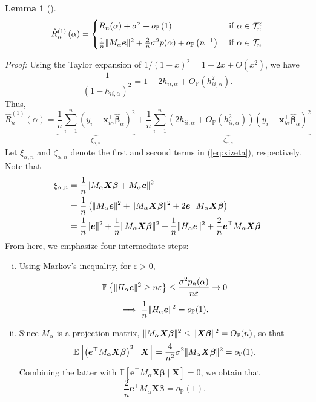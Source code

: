 \documentclass[11pt, letter paper]{article}
\newcommand{\1}{\mathmybb{1}}
\newtheorem{lemma}[proposition]{Lemma}
\newcommand{\0}{\emptyset}
\newcommand{\prob}{\mathbb{P}}
\newcommand{\Ep}[1]{\mathbb{E}\left[ #1 \right]}
\newcommand{\paren}[1]{\left(#1 \right)}
\newcommand{\set}[1]{\left\{ #1 \right\}}
\newcommand{\norm}[1]{|\hspace{-1pt}|#1 |\hspace{-1pt}|}
\newcommand{\normsq}[1]{\norm{#1}^{2}}
\newcommand{\Tcal}{\mathcal{T}_{n}}
\newcommand{\X}{\boldsymbol{X}}
\newcommand{\x}{\boldsymbol{x}}
\newcommand{\e}{\boldsymbol{e}}
\newcommand{\bbeta}{\boldsymbol{\beta}}
\newcommand{\bbetahat}{\boldsymbol{\hat{\beta}}}
\newcommand{\lev}{h_{ii,\alpha}}
\newcommand{\loocv}[1]{\hat{R}^{(1)}_{n}\paren{#1}}
\newcommand{\op}[1]{o_{\prob}\paren{#1}}
\newcommand{\Op}[1]{O_{\prob}\paren{#1}}
\begin{document}
\begin{lemma}[\cite{shao_1993}]\label{lem:lemmadecomp}
    \begin{equation}\label{eq:lemmadecomp}
    \loocv{\alpha} = \begin{cases}
        R_{n}(\alpha) + \sigma^{2} + \op{1} &\text{ if }\alpha\in\Tcal^{c}\\[2mm]
        \frac{1}{n}\normsq{M_{\alpha}\e} + \frac{2}{n}\sigma^{2}p(\alpha) + \op{n^{-1}} &\text{ if }\alpha\in\Tcal
    \end{cases}
    \end{equation}
\end{lemma}

\begin{myproofbox}
    \textit{Proof: }
    Using the Taylor expansion of \(1/{(1-x)}^{2} = 1+2x + O(x^{2})\), we have
    \[\frac{1}{\paren{1-\lev}^{2}} = 1 + 2\lev + \Op{\lev^{2}}.\]
    Thus,
    \begin{equation}
        \label{eq:xizeta}
        \loocv{\alpha} = \underbrace{\frac{1}{n}\sum_{i=1}^{n}\paren{y_{i}-\x_{i\alpha}^{\top}\bbetahat_{\alpha}}^{2}}_{\xi_{\alpha,n}} + \underbrace{\frac{1}{n}\sum_{i=1}^{n}\paren{2\lev + \Op{\lev^{2}}}\paren{y_{i}-\x_{i\alpha}^{\top}\bbetahat_{\alpha}}^{2}}_{\zeta_{\alpha,n}}
    \end{equation}
    Let \(\xi_{\alpha,n}\) and \(\zeta_{\alpha,n}\) denote the first and second terms in (\ref{eq:xizeta}), respectively. Note that
    \begin{align}
        \notag\xi_{\alpha,n} &= \frac{1}{n}\normsq{M_{\alpha}\X\bbeta + M_{\alpha}\e}\\
        \label{line:decomp}&= \frac{1}{n}\paren{\normsq{M_{\alpha}\e} + \normsq{M_{\alpha}\X\bbeta} + 2 \e^{\top}M_{\alpha}\X\bbeta}\\
        \label{line:decomp2}&=\frac{1}{n}\normsq{\e} + \frac{1}{n}\normsq{M_{\alpha}\X\bbeta} + \frac{1}{n}\normsq{H_{\alpha}\e} + \frac{2}{n}\e^{\top}M_{\alpha}\X\bbeta
    \end{align}
    From here, we emphasize four intermediate steps:
    \begin{enumerate}[i.]
        \item Using Markov's inequality, for \(\varepsilon>0\), \[\prob\set{\normsq{H_{\alpha}\e}\geq n\varepsilon}\leq \frac{\sigma^{2}p_{n}(\alpha)}{n\varepsilon}\to 0\] 
        \[\implies \frac{1}{n}\normsq{H_{\alpha}\e} = o_{\prob}(1).\]
        \item Since \(M_{\alpha}\) is a projection matrix, \(\normsq{M_{\alpha}\X\bbeta}\leq \normsq{\X\bbeta} = O_{\prob}(n)\), so that \[\Ep{\paren{\e^{\top} M_{\alpha}\X\bbeta}^{2}\mid\X} = \frac{4}{n^{2}}\sigma^{2}\normsq{M_{\alpha}\X\bbeta} = o_{\prob}(1).\] Combining the latter with \(\Ep{\e^{\top} M_{\alpha}\X\bbeta\mid\X} = 0\), we obtain that \[\frac{2}{n}\e^{\top}M_{\alpha}\X\bbeta = o_{\prob}(1).\]

\end{enumerate}
\end{myproofbox}
\end{document}
